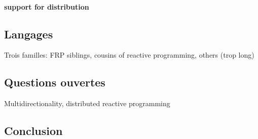 \documentclass[11pt]{article}
\begin{document}
\begin{multicols}{2}
\paragraph{support for distribution}

\subsection*{Langages}
Trois familles: FRP siblings, cousins of reactive programming, others (trop long)

\subsection*{Questions ouvertes}
Multidirectionality, distributed reactive programming 

\subsection*{Conclusion}

\end{multicols}
\end{document}
